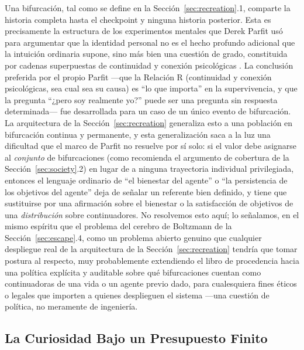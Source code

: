 \documentclass[11pt]{article}
\begin{document}
Una bifurcación, tal como se define en la Sección~\ref{sec:recreation}.1, comparte la historia completa hasta el checkpoint y ninguna historia posterior. Esta es precisamente la estructura de los experimentos mentales que Derek Parfit usó para argumentar que la identidad personal no es el hecho profundo adicional que la intuición ordinaria supone, sino más bien una cuestión de grado, constituida por cadenas superpuestas de continuidad y conexión psicológicas \citep{parfit1984reasons}. La conclusión preferida por el propio Parfit —que la Relación R (continuidad y conexión psicológicas, sea cual sea su causa) es ``lo que importa'' en la supervivencia, y que la pregunta ``¿pero soy realmente yo?'' puede ser una pregunta sin respuesta determinada— fue desarrollada para un caso de un único evento de bifurcación. La arquitectura de la Sección~\ref{sec:recreation} generaliza esto a una población en bifurcación continua y permanente, y esta generalización saca a la luz una dificultad que el marco de Parfit no resuelve por sí solo: si el valor debe asignarse al \emph{conjunto} de bifurcaciones (como recomienda el argumento de cobertura de la Sección~\ref{sec:society}.2) en lugar de a ninguna trayectoria individual privilegiada, entonces el lenguaje ordinario de ``el bienestar del agente'' o ``la persistencia de los objetivos del agente'' deja de señalar un referente bien definido, y tiene que sustituirse por una afirmación sobre el bienestar o la satisfacción de objetivos de una \emph{distribución} sobre continuadores. No resolvemos esto aquí; lo señalamos, en el mismo espíritu que el problema del cerebro de Boltzmann de la Sección~\ref{sec:escape}.4, como un problema abierto genuino que cualquier despliegue real de la arquitectura de la Sección~\ref{sec:recreation} tendría que tomar postura al respecto, muy probablemente extendiendo el libro de procedencia hacia una política explícita y auditable sobre qué bifurcaciones cuentan como continuadoras de una vida o un agente previo dado, para cualesquiera fines éticos o legales que importen a quienes desplieguen el sistema —una cuestión de política, no meramente de ingeniería.

\subsection{La Curiosidad Bajo un Presupuesto Finito}
\end{document}
